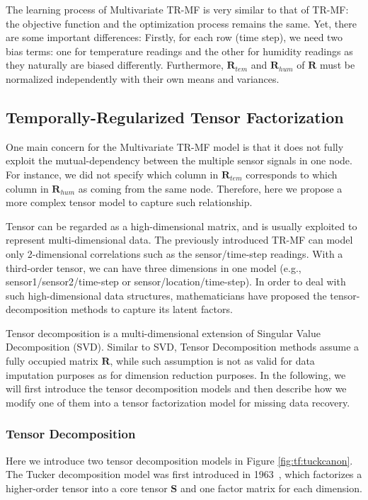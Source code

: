 The learning process of Multivariate TR-MF is very similar to that of TR-MF: the objective function and the optimization process remains the same. Yet, there are some important differences: 
Firstly, for each row (time step), we need two bias terms: one for temperature readings and the other for humidity readings as they naturally are biased differently. Furthermore, $\mathbf{R}_{tem}$ and $\mathbf{R}_{hum}$ of $\mathbf{R}$ must be normalized independently with their own means and variances. 

 
\subsection{Temporally-Regularized Tensor Factorization} \label{sec:tensordecomp}

One main concern for the Multivariate TR-MF model is that it does not fully exploit the mutual-dependency between the multiple sensor signals in one node. For instance, we did not specify which column in $\mathbf{R}_{tem}$ corresponds to which column in $\mathbf{R}_{hum}$ as coming from the same node. Therefore, here we propose a more complex tensor model to capture such relationship. 

Tensor can be regarded as a high-dimensional matrix, and is usually exploited to represent multi-dimensional data. The previously introduced TR-MF can model only 2-dimensional correlations such as the sensor/time-step readings. With a third-order tensor, we can have three dimensions in one model (e.g., sensor1/sensor2/time-step or sensor/location/time-step). In order to deal with such high-dimensional data structures, mathematicians have proposed the tensor-decomposition methods to capture its latent factors. 

Tensor decomposition is a multi-dimensional extension of Singular Value Decomposition (SVD). Similar to SVD, Tensor Decomposition methods assume a fully occupied matrix $\mathbf{R}$, while such assumption is not as valid for data imputation purposes as for dimension reduction purposes.
In the following, we will first introduce the tensor decomposition models and then describe how we modify one of them into a tensor factorization model for missing data recovery. 

 
\subsubsection{Tensor Decomposition}
Here we introduce two tensor decomposition models in Figure \ref{fig:tf:tuckcanon}. The Tucker decomposition model was first introduced in 1963~\cite{tucker1963implications}, which factorizes a higher-order tensor into a core tensor $\mathbf{S}$ and one factor matrix for each dimension.

